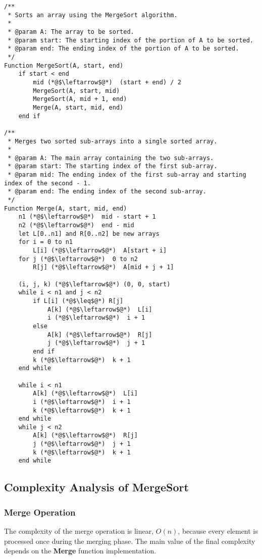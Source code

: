 \begin{lstlisting}[language=PseudoCode, caption=MergeSort and its Merge function]
/**
 * Sorts an array using the MergeSort algorithm.
 * 
 * @param A: The array to be sorted.
 * @param start: The starting index of the portion of A to be sorted.
 * @param end: The ending index of the portion of A to be sorted.
 */
Function MergeSort(A, start, end)
    if start < end
        mid (*@$\leftarrow$@*)  (start + end) / 2
        MergeSort(A, start, mid)
        MergeSort(A, mid + 1, end)
        Merge(A, start, mid, end)
    end if
    
/**
 * Merges two sorted sub-arrays into a single sorted array.
 * 
 * @param A: The main array containing the two sub-arrays.
 * @param start: The starting index of the first sub-array.
 * @param mid: The ending index of the first sub-array and starting index of the second - 1.
 * @param end: The ending index of the second sub-array.
 */
Function Merge(A, start, mid, end)
    n1 (*@$\leftarrow$@*)  mid - start + 1
    n2 (*@$\leftarrow$@*)  end - mid
    let L[0..n1] and R[0..n2] be new arrays
    for i = 0 to n1
        L[i] (*@$\leftarrow$@*)  A[start + i]
    for j (*@$\leftarrow$@*)  0 to n2
        R[j] (*@$\leftarrow$@*)  A[mid + j + 1]
    
    (i, j, k) (*@$\leftarrow$@*) (0, 0, start)
    while i < n1 and j < n2
        if L[i] (*@$\leq$@*) R[j]
            A[k] (*@$\leftarrow$@*)  L[i]
            i (*@$\leftarrow$@*)  i + 1
        else
            A[k] (*@$\leftarrow$@*)  R[j]
            j (*@$\leftarrow$@*)  j + 1
        end if
        k (*@$\leftarrow$@*)  k + 1
    end while
    
    while i < n1
        A[k] (*@$\leftarrow$@*)  L[i]
        i (*@$\leftarrow$@*)  i + 1
        k (*@$\leftarrow$@*)  k + 1
    end while
    while j < n2
        A[k] (*@$\leftarrow$@*)  R[j]
        j (*@$\leftarrow$@*)  j + 1
        k (*@$\leftarrow$@*)  k + 1
    end while
\end{lstlisting}

\subsection{Complexity Analysis of MergeSort}
\subsubsection{Merge Operation}
The complexity of the merge operation is linear, \(O(n)\), because every element is processed once during the merging phase. The main value of the final complexity depends on the \textbf{Merge} function implementation.

